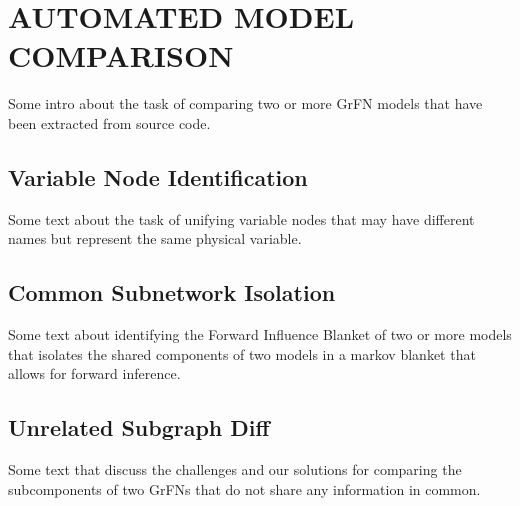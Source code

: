 \chapter{AUTOMATED MODEL COMPARISON\label{chapter:comparison}}

Some intro about the task of comparing two or more GrFN models that have been extracted from source code.

\section{Variable Node Identification\label{sec:var_ident}}

Some text about the task of unifying variable nodes that may have different names but represent the same physical variable.

\section{Common Subnetwork Isolation\label{sec:subnet_iso}}

Some text about identifying the Forward Influence Blanket of two or more models that isolates the shared components of two models in a markov blanket that allows for forward inference.

\section{Unrelated Subgraph Diff\label{sec:unrelated_diff}}

Some text that discuss the challenges and our solutions for comparing the subcomponents of two GrFNs that do not share any information in common.
